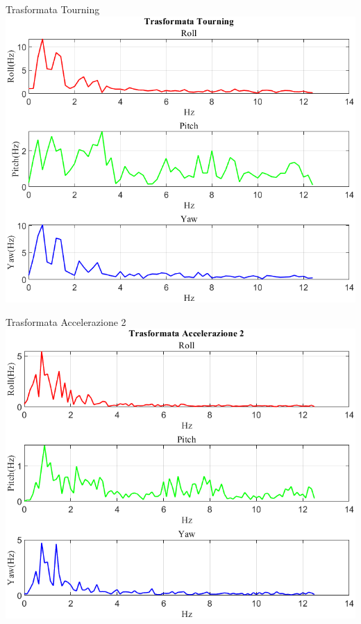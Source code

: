 \documentclass[beamer]{standalone}
\begin{document}
	\begin{frame}{{Trasformata Tourning}}
		\centering\includegraphics[height=.8\textheight]{figure/VAng/Trasformata/Trasformata Tourning}
	\end{frame}
	
	\begin{frame}{{Trasformata Accelerazione 2}}
		\centering\includegraphics[height=.8\textheight]{figure/VAng/Trasformata/Trasformata Accelerazione 2}
	\end{frame}
	
\end{document}
